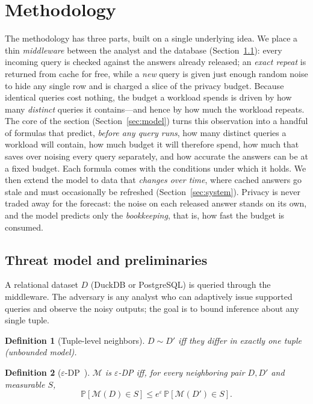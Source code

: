 \documentclass[sigconf,nonacm]{acmart}
\newcommand{\eps}{\varepsilon}
\newcommand{\Prob}{\mathbb{P}}
\newtheorem{defn}{Definition}
\begin{document}
\section{Methodology}
\label{sec:method}

\noindent The methodology has three parts, built on a single underlying idea. We place a thin \emph{middleware} between the analyst and the database (Section~\ref{sec:prelim}): every incoming query is checked against the answers already released; an \emph{exact repeat} is returned from cache for free, while a \emph{new} query is given just enough random noise to hide any single row and is charged a slice of the privacy budget. Because identical queries cost nothing, the budget a workload spends is driven by how many \emph{distinct} queries it contains---and hence by how much the workload repeats. The core of the section (Section~\ref{sec:model}) turns this observation into a handful of formulas that predict, \emph{before any query runs}, how many distinct queries a workload will contain, how much budget it will therefore spend, how much that saves over noising every query separately, and how accurate the answers can be at a fixed budget. Each formula comes with the conditions under which it holds. We then extend the model to data that \emph{changes over time}, where cached answers go stale and must occasionally be refreshed (Section~\ref{sec:system}). Privacy is never traded away for the forecast: the noise on each released answer stands on its own, and the model predicts only the \emph{bookkeeping}, that is, how fast the budget is consumed.

\subsection{Threat model and preliminaries}
\label{sec:prelim}

A relational dataset $D$ (DuckDB or PostgreSQL) is queried through the middleware. The adversary is any analyst who can adaptively issue supported queries and observe the noisy outputs; the goal is to bound inference about any single tuple.

\begin{defn}[Tuple-level neighbors]
$D\sim D'$ iff they differ in exactly one tuple (unbounded model).
\end{defn}
\begin{defn}[$\eps$-DP~\cite{dwork2006calibrating}]
$\mathcal{M}$ is $\eps$-DP iff, for every neighboring pair $D,D'$ and measurable $S$,
\[\Prob[\mathcal{M}(D)\in S]\le e^\eps\,\Prob[\mathcal{M}(D')\in S].\]
\end{defn}
\end{document}
